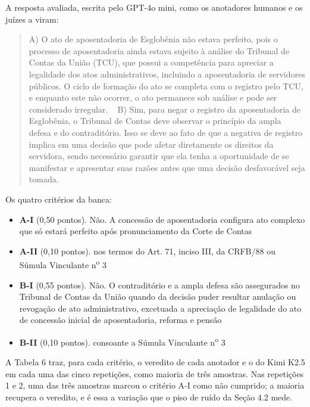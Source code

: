 \documentclass{IOS-Book-Article}
\begin{document}
A resposta avaliada, escrita pelo GPT-4o mini, como os anotadores humanos e os juízes a viram:

\begin{quote}\footnotesize\ttfamily\raggedright
A) O ato de aposentadoria de Esglobênia não estava perfeito, pois o processo de aposentadoria ainda estava sujeito à análise do Tribunal de Contas da União (TCU), que possui a competência para apreciar a legalidade dos atos administrativos, incluindo a aposentadoria de servidores públicos. O ciclo de formação do ato se completa com o registro pelo TCU, e enquanto este não ocorrer, o ato permanece sob análise e pode ser considerado irregular.\newline
~\newline
B) Sim, para negar o registro da aposentadoria de Esglobênia, o Tribunal de Contas deve observar o princípio da ampla defesa e do contraditório. Isso se deve ao fato de que a negativa de registro implica em uma decisão que pode afetar diretamente os direitos da servidora, sendo necessário garantir que ela tenha a oportunidade de se manifestar e apresentar suas razões antes que uma decisão desfavorável seja tomada.
\end{quote}

Os quatro critérios da banca:

\begin{itemize}
\item \textbf{A-I} (0,50 pontos). Não. A concessão de aposentadoria configura ato complexo que só estará perfeito após pronunciamento da Corte de Contas
\item \textbf{A-II} (0,10 pontos). nos termos do Art. 71, inciso III, da CRFB/88 ou Súmula Vinculante n\textsuperscript{o} 3
\item \textbf{B-I} (0,55 pontos). Não. O contraditório e a ampla defesa são assegurados no Tribunal de Contas da União quando da decisão puder resultar anulação ou revogação de ato administrativo, excetuada a apreciação de legalidade do ato de concessão inicial de aposentadoria, reforma e pensão
\item \textbf{B-II} (0,10 pontos). consoante a Súmula Vinculante n\textsuperscript{o} 3
\end{itemize}

A Tabela 6 traz, para cada critério, o veredito de cada anotador e o do Kimi K2.5 em cada uma das cinco repetições, como maioria de três amostras. Nas repetições 1 e 2, uma das três amostras marcou o critério A-I como não cumprido; a maioria recupera o veredito, e é essa a variação que o piso de ruído da Seção 4.2 mede.
\end{document}
